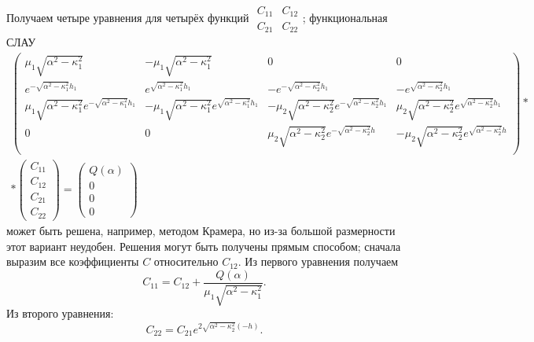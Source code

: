 \documentclass[a4paper, 12pt]{article}
\newcommand{\m}[1]{\mu_{#1}}
\newcommand{\sig}[1]{\sqrt{\alpha^2-\kappa_#1^2}}
\begin{document}
Получаем четыре уравнения для четырёх функций $\begin{matrix} C_{11} & C_{12} \\ C_{21} & C_{22} \end{matrix}$; функциональная СЛАУ
\begin{multline}
  \begin{pmatrix} 
\m{1}\sig{1} & -\m{1}\sig{1} & 0 & 0 \\
e^{-\sig{1}h_1} & e^{\sig{1}h_1} & -e^{-\sig{2}h_1} & -e^{\sig{2}h_1}\\
\m{1}\sig{1}e^{-\sig{1}h_1} & -\m{1}\sig{1}e^{\sig{1}h_1} & -\m{2}\sig{2}e^{-\sig{2}h_1} & \m{2}\sig{2}e^{\sig{2}h_1}\\
0 & 0 & \m{2}\sig{2}e^{-\sig{2}h} & -\m{2}\sig{2}e^{\sig{2}h}\\
\end{pmatrix}*\\
*\begin{pmatrix} C_{11} \\ C_{12} \\ C_{21} \\ C_{22} \end{pmatrix}=\begin{pmatrix} Q(\alpha) \\ 0 \\ 0 \\ 0 \end{pmatrix}  
\end{multline}
может быть решена, например, методом Крамера, но из-за большой размерности этот вариант неудобен. Решения могут быть получены прямым способом; сначала выразим все коэффициенты $C$ относительно $C_{12}$. Из первого уравнения получаем 
$$C_{11}=C_{12}+\frac{Q(\alpha)}{\mu_1 \sqrt{\alpha^2-\kappa_1^2}}.$$
Из второго уравнения:
$$C_{22}=C_{21} e^{2\sqrt{\alpha^2-\kappa_2^2}(-h)}.$$
\end{document}
